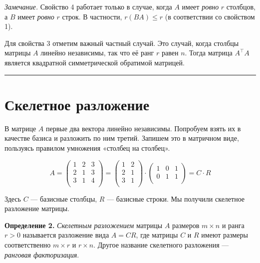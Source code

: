 \documentclass[11pt,a4paper]{article}
\renewcommand{\linethickness}{0.1ex}
\begin{document}
    \emph{Замечание.} Свойство 4 работает только в случае, когда \(A\) имеет
\emph{ровно} \(r\) столбцов, а \(B\) имеет \emph{ровно} \(r\) строк. В
частности, \(r(BA) \le r\) (в соответствии со свойством 1).

Для свойства 3 отметим важный частный случай. Это случай, когда столбцы
матрицы \(A\) линейно независимы, так что её ранг \(r\) равен \(n\).
Тогда матрица \(A^\top A\) является квадратной симметрической обратимой
матрицей.

    \begin{center}\rule{0.5\linewidth}{\linethickness}\end{center}

    \hypertarget{ux441ux43aux435ux43bux435ux442ux43dux43eux435-ux440ux430ux437ux43bux43eux436ux435ux43dux438ux435}{%
\section{Скелетное
разложение}\label{ux441ux43aux435ux43bux435ux442ux43dux43eux435-ux440ux430ux437ux43bux43eux436ux435ux43dux438ux435}}

В матрице \(A\) первые два вектора линейно независимы. Попробуем взять
их в качестве базиса и разложить по ним третий. Запишем это в матричном
виде, пользуясь правилом умножения «столбец на столбец».

\[
  A = 
  \begin{pmatrix}
     1 & 2 & 3 \\
     2 & 1 & 3 \\
     3 & 1 & 4 \\
  \end{pmatrix}
  =
  \begin{pmatrix}
     1 & 2 \\
     2 & 1 \\
     3 & 1 \\
  \end{pmatrix}
  \cdot
  \begin{pmatrix}
     1 & 0 & 1 \\
     0 & 1 & 1 \\
  \end{pmatrix}
  = C \cdot R
\]

Здесь \(C\) --- базисные столбцы, \(R\) --- базисные строки. Мы получили
скелетное разложение матрицы.

\textbf{Определение 2.} \emph{Скелетным разложением} матрицы \(A\)
размеров \(m \times n\) и ранга \(r>0\) называется разложение вида
\(A = CR\), где матрицы \(C\) и \(R\) имеют размеры соответственно
\(m \times r\) и \(r \times n\). Другое название скелетного разложения
--- \emph{ранговая факторизация}.
\end{document}
